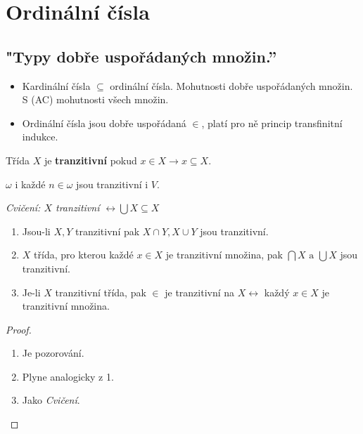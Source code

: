 \chapter{Ordinální čísla}

\section{"Typy dobře uspořádaných množin.”}

\begin{itemize}
	\item Kardinální čísla $\subseteq$ ordinální čísla. Mohutnosti dobře uspořádaných množin. S (AC) mohutnosti všech množin.
	\item Ordinální čísla jsou dobře uspořádaná $\in$, platí pro ně princip transfinitní indukce.
\end{itemize}

\begin{definice}
	Třída $X$ je \textbf{tranzitivní} pokud $x \in X \rightarrow x \subseteq X$.
\end{definice}

\begin{prikl}
	$\omega$ i každé $n \in \omega$ jsou tranzitivní i $V$.
\end{prikl}

\textit{Cvičení: $X$ tranzitivní $\leftrightarrow \bigcup X \subseteq X$}

\begin{lemma}
	\begin{enumerate}
		\item Jsou-li $X,Y$ tranzitivní pak $X \cap Y, X \cup Y$ jsou tranzitivní.
		\item $X$ třída, pro kterou každé $x \in X$ je tranzitivní množina, pak $\bigcap X \text{ a } \bigcup X$ jsou tranzitivní.
		\item Je-li $X$ tranzitivní třída, pak $\in$ je tranzitivní na $X \leftrightarrow$ každý $x \in X$ je tranzitivní množina.
	\end{enumerate}
\end{lemma}

\begin{proof}
	\begin{enumerate}
		\item Je pozorování.
		\item Plyne analogicky z 1.
		\item Jako \textit{Cvičení}.
	\end{enumerate}
\end{proof}

